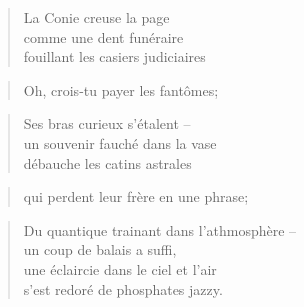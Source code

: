   \begin{verse}
    La Conie creuse la page\\
    comme une dent funéraire\\
    fouillant les casiers judiciaires
  \end{verse}
  \begin{verse}
    Oh, crois-tu payer les fantômes;
  \end{verse}
  \begin{verse}
    Ses bras curieux s’étalent --\\
    un souvenir fauché dans la vase\\
    débauche les catins astrales
  \end{verse}
  \begin{verse}
    qui perdent leur frère en une phrase;
  \end{verse}
  \begin{verse}
    Du quantique trainant dans l’athmosphère --\\
    un coup de balais a suffi,\\
    une éclaircie dans le ciel et l’air\\
    s’est redoré de phosphates jazzy.
  \end{verse}
